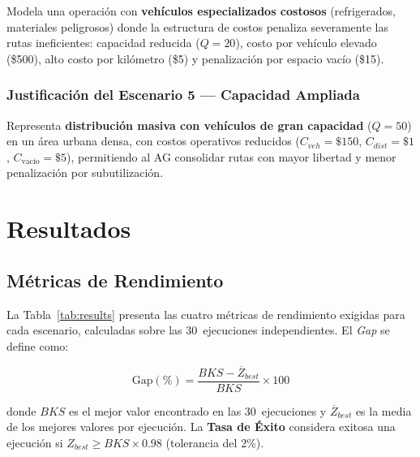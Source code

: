\documentclass[12pt,letterpaper]{article}
\begin{document}
\begin{yellowbox}
Modela una operación con \textbf{vehículos especializados costosos} (refrigerados, materiales peligrosos) donde la estructura de costos penaliza severamente las rutas ineficientes: capacidad reducida ($Q=20$), costo por vehículo elevado (\$500), alto costo por kilómetro (\$5) y penalización por espacio vacío (\$15).
\end{yellowbox}

\subsubsection{Justificación del Escenario 5 — Capacidad Ampliada}

\begin{yellowbox}
Representa \textbf{distribución masiva con vehículos de gran capacidad} ($Q=50$) en un área urbana densa, con costos operativos reducidos ($C_{veh}=\$150$, $C_{dist}=\$1$, $C_{\text{vac\'io}}=\$5$), permitiendo al AG consolidar rutas con mayor libertad y menor penalización por subutilización.
\end{yellowbox}

\section{Resultados}

\subsection{Métricas de Rendimiento}

La Tabla~\ref{tab:results} presenta las cuatro métricas de rendimiento exigidas para cada escenario, calculadas sobre las 30~ejecuciones independientes. El \textit{Gap} se define como:

\begin{formulabox}
\begin{equation}
\text{Gap}(\%) = \frac{BKS - \overline{Z}_{best}}{BKS} \times 100
\label{eq:gap}
\end{equation}
\end{formulabox}

\noindent donde $BKS$ es el mejor valor encontrado en las 30~ejecuciones y $\overline{Z}_{best}$ es la media de los mejores valores por ejecución. La \textbf{Tasa de Éxito} considera exitosa una ejecución si $Z_{best} \geq BKS \times 0.98$ (tolerancia del 2\%).
\end{document}
